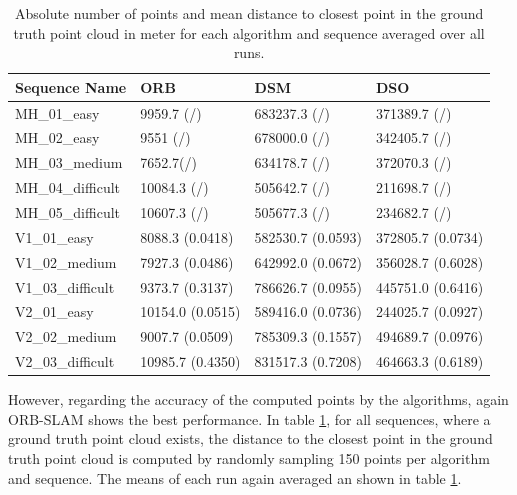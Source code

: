 	\begin{table}
	\caption{Absolute number of points and mean distance to closest point in the ground truth point cloud in meter for each algorithm and sequence averaged over all runs.}
	\begin{tabular}{ |p{3cm}||p{3cm}|p{3cm}|p{3cm}|  }
	\hline
	Sequence Name& ORB & DSM & DSO \\
	\hline
	MH\_01\_easy & 9959.7 (/) & 683237.3 (/) & 371389.7 (/)\\
	MH\_02\_easy & 9551 (/) & 678000.0 (/) & 342405.7 (/)\\
	MH\_03\_medium & 7652.7(/) & 634178.7 (/) & 372070.3 (/)\\
	MH\_04\_difficult & 10084.3 (/) & 505642.7 (/) & 211698.7 (/)\\
	MH\_05\_difficult & 10607.3 (/) & 505677.3 (/) & 234682.7 (/)\\
	V1\_01\_easy & 8088.3 (0.0418) & 582530.7 (0.0593) & 372805.7 (0.0734)\\
	V1\_02\_medium & 7927.3 (0.0486) & 642992.0 (0.0672) & 356028.7 (0.6028)\\
	V1\_03\_difficult & 9373.7 (0.3137) & 786626.7 (0.0955) & 445751.0 (0.6416)\\
	V2\_01\_easy & 10154.0 (0.0515) & 589416.0 (0.0736) & 244025.7 (0.0927)\\
	V2\_02\_medium & 9007.7 (0.0509)& 785309.3 (0.1557) & 494689.7 (0.0976)\\
	V2\_03\_difficult & 10985.7 (0.4350) & 831517.3 (0.7208) & 464663.3 (0.6189)\\
	\hline
	\end{tabular}
	\label{table:pointcloud}
	\end{table}
	
	However, regarding the accuracy of the computed points by the algorithms, again ORB-SLAM shows the best performance. In table \ref{table:pointcloud}, 
	for all sequences, where a ground truth point cloud exists, the distance to the closest point in the ground truth point cloud is computed by randomly sampling
	150 points per algorithm and sequence. The means of each run again averaged an shown in table \ref{table:pointcloud}. 
	
	
